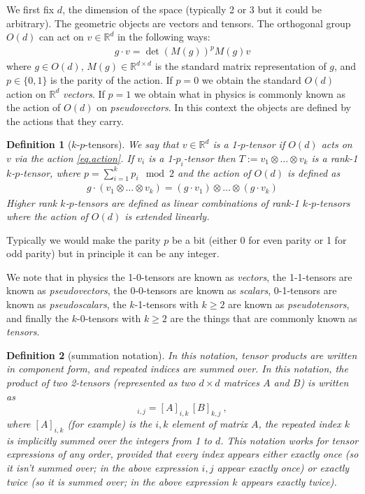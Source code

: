 \documentclass{article}
\theoremstyle{plain}
\newtheorem{definition}{Definition}
\begin{document}
We first fix $d$, the dimension of the space (typically 2 or 3 but it could be arbitrary). The geometric objects are vectors and tensors. 
The orthogonal group $O(d)$ can act on $v \in \mathbb R^d$ in the following ways:
\begin{align} \label{eq.action}
    g\cdot v = \det(M(g))^p M(g) v 
\end{align}
where $g\in O(d)$, $M(g)\in \mathbb R^{d\times d}$ is the standard matrix representation of $g$, and $p\in\{0,1\}$ is the parity of the action. If $p=0$ we obtain the standard $O(d)$ action on $\mathbb R^d$ \emph{vectors}. If $p=1$ we obtain what in physics is commonly known as the action of $O(d)$ on \emph{pseudovectors}. In this context the objects are defined by the actions that they carry.

\begin{definition}[$k$-$p$-tensors] \label{def.tensors}
We say that $v\in \mathbb R^d$ is a 1-$p$-tensor if $O(d)$ acts on $v$ via the action \eqref{eq.action}. 
If $v_i$ is a 1-$p_i$-tensor then $T:=v_{1}\otimes\ldots \otimes v_k$ is a rank-1 $k$-$p$-tensor, where $p=\sum_{i=1}^k p_i \mod 2$ and the action of $O(d)$ is defined as
\begin{align}
    g\cdot (v_{1}\otimes\ldots \otimes v_k) = (g\cdot v_1)\otimes \ldots \otimes (g\cdot v_k)
\end{align}
Higher rank $k$-$p$-tensors are defined as linear combinations of rank-1  $k$-$p$-tensors where the action of $O(d)$ is extended linearly.
\end{definition}
Typically we would make the parity $p$ be a bit (either 0 for even parity or 1 for odd parity) but in principle it can be any integer.

We note that in physics the 1-0-tensors are known as \emph{vectors}, the 1-1-tensors are known as \emph{pseudovectors}, the 0-0-tensors are known as \emph{scalars}, 0-1-tensors are known as \emph{pseudoscalars}, the $k$-1-tensors with $k\geq 2$ are known as \emph{pseudotensors}, and finally the $k$-0-tensors with $k\geq 2$ are the things that are commonly known as \emph{tensors}.

\begin{definition}[summation notation]
In this notation, tensor products are written in component form, and repeated indices are summed over.
In this notation, the product of two 2-tensors (represented as two $d\times d$ matrices $A$ and $B$) is written as
\begin{equation}
    [A\, B]_{i,j} = [A]_{i,k}\,[B]_{k,j} ~,
\end{equation}
where $[A]_{i,k}$ (for example) is the $i,k$ element of matrix $A$, the repeated index $k$ is implicitly summed over the integers from 1 to $d$.
This notation works for tensor expressions of any order, provided that every index appears either exactly once (so it isn't summed over; in the above expression $i, j$ appear exactly once) or exactly twice (so it is summed over; in the above expression $k$ appears exactly twice). 
\end{definition}
\end{document}
